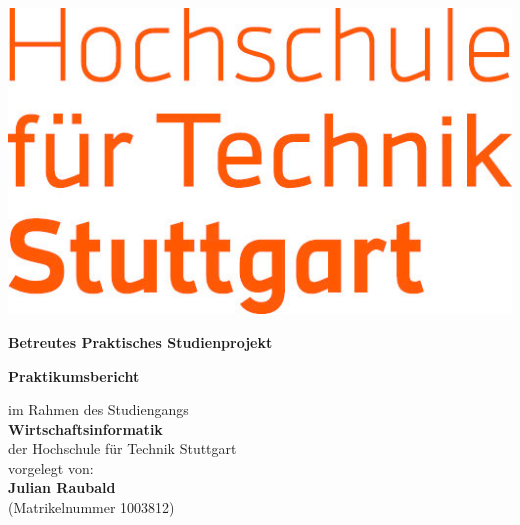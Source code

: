 \begin{titlepage}
    \begin{center}
        \includegraphics{figures/HFT-Logo.jpg}\\
        \normalsize
        \sffamily
        
        \vspace{0.5cm} 
        
        \Huge
        \textbf{Betreutes Praktisches Studienprojekt}
        \vfill
        
        \normalsize
        \textbf{Praktikumsbericht} \\
        \vspace{0.4cm}
        
        im Rahmen des Studiengangs\\
        \textbf{Wirtschaftsinformatik}\\
        der Hochschule für Technik Stuttgart\\

        
        \vspace{0.8cm}
        vorgelegt von: \\
        \large
        \textbf{Julian Raubald}\\ 
        (Matrikelnummer 1003812)\\
        

\end{center}
\end{titlepage}
